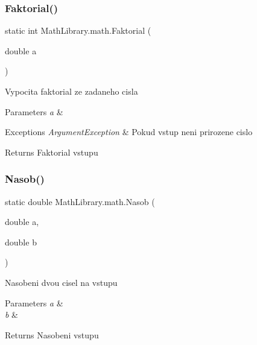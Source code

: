 \subsubsection{\texorpdfstring{Faktorial()}{Faktorial()}}
{\footnotesize\ttfamily static int Math\+Library.\+math.\+Faktorial (\begin{DoxyParamCaption}\item[{double}]{a }\end{DoxyParamCaption})\hspace{0.3cm}{\ttfamily [static]}}



Vypocita faktorial ze zadaneho cisla 


\begin{DoxyParams}{Parameters}
{\em a} & \\
\hline
\end{DoxyParams}

\begin{DoxyExceptions}{Exceptions}
{\em Argument\+Exception} & Pokud vstup neni prirozene cislo\\
\hline
\end{DoxyExceptions}
\begin{DoxyReturn}{Returns}
Faktorial vstupu
\end{DoxyReturn}
\mbox{\label{class_math_library_1_1math_a39f0ce528d77e03cf63a00333f5973e6}} 
\subsubsection{\texorpdfstring{Nasob()}{Nasob()}}
{\footnotesize\ttfamily static double Math\+Library.\+math.\+Nasob (\begin{DoxyParamCaption}\item[{double}]{a,  }\item[{double}]{b }\end{DoxyParamCaption})\hspace{0.3cm}{\ttfamily [static]}}



Nasobeni dvou cisel na vstupu 


\begin{DoxyParams}{Parameters}
{\em a} & \\
\hline
{\em b} & \\
\hline
\end{DoxyParams}
\begin{DoxyReturn}{Returns}
Nasobeni vstupu
\end{DoxyReturn}
\mbox{\label{class_math_library_1_1math_a95a9b98b570e2f0ba44042550d9480c1}} 
